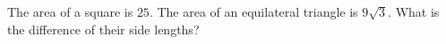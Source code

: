 The area of a square is $25$. The area of an equilateral triangle is $9\sqrt3$. What is the difference of their side lengths?
